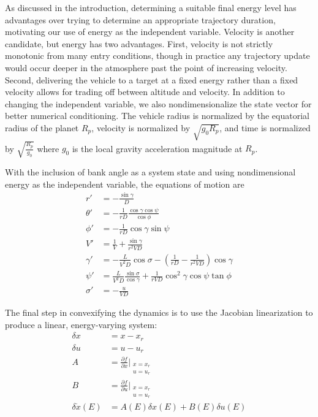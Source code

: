 \documentclass[letterpaper, preprint, paper,11pt]{AAS}	%
\begin{document}
	As discussed in the introduction, determining a suitable final energy level has advantages over trying to determine an appropriate trajectory duration, motivating our use of energy as the independent variable. Velocity is another candidate, but energy has two advantages. First, velocity is not strictly monotonic from many entry conditions, though in practice any trajectory update would occur deeper in the atmosphere past the point of increasing velocity. Second, delivering the vehicle to a target at a fixed energy rather than a fixed velocity allows for trading off between altitude and velocity. In addition to changing the independent variable, we also nondimensionalize the state vector for better numerical conditioning. The vehicle radius is normalized by the equatorial radius of the planet $R_p$, velocity is normalized by $\sqrt{g_0R_p}$, and time is normalized by $\sqrt{\frac{R_p}{g_0}}$ where $g_0$ is the local gravity acceleration magnitude at $R_p$.
	
	With the inclusion of bank angle as a system state and using nondimensional energy as the independent variable, the equations of motion are
	\begin{align}
	r' &= -\frac{\sin\gamma}{D}\\
	\theta' &= -\frac{1}{rD}\frac{\cos\gamma\cos\psi}{\cos\phi}\\
	\phi' &= -\frac{1}{rD}\cos\gamma\sin\psi \\
	V' &= \frac{1}{V} + \frac{\sin\gamma}{r^2VD} \\
	\gamma' &= -\frac{L}{V^2D}\cos\sigma - \left(\frac{1}{rD}-\frac{1}{r^2VD}\right)\cos\gamma \\
	\psi' &= \frac{L}{V^2D}\frac{\sin\sigma}{\cos\gamma} + \frac{1}{rVD}\cos^2\gamma\cos\psi\tan\phi \\
	\sigma' &= -\frac{u}{VD}
	\end{align}	
	
	The final step in convexifying the dynamics is to use the Jacobian linearization to produce a linear, energy-varying system:
 	\begin{align}
 	\delta x &= x - x_r \\
 	\delta u &= u - u_r \\
 	A &= \frac{\partial f}{\partial x}|_{\substack{x=x_r\\u=u_r}} \\
	B &= \frac{\partial f}{\partial u}|_{\substack{x=x_r\\u=u_r}} \\
	\delta\dot{x}(E) &= A(E)\delta x(E) + B(E)\delta u(E) \label{eq_LTV_approx}
 	\end{align}
	
\end{document}
